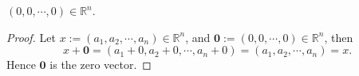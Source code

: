 \begin{Exercise}
\begin{answer}
$(0, 0, \cdots, 0)\in\mathbb{R}^n$.
\end{answer}
\begin{proof}
Let $x := (a_1, a_2, \cdots, a_n)\in\mathbb{R}^n$, and $\mathbf{0} := (0, 0, \cdots, 0)\in\mathbb{R}^n$, then 
$$
x+\mathbf{0}
= (a_1 + 0, a_2 + 0, \cdots, a_n + 0)
= (a_1, a_2, \cdots, a_n)
= x.
$$
Hence $\mathbf{0}$ is the zero vector.
\end{proof}
\end{Exercise}